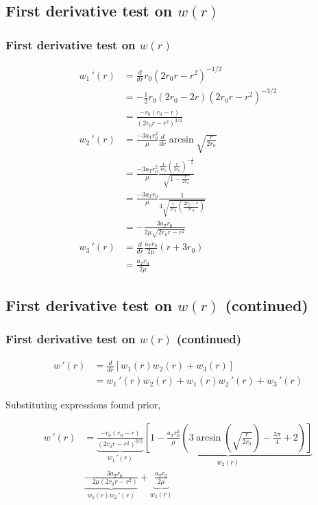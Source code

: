 \documentclass{beamer}
\newcommand{\sectit}[1]{
    \section{\texorpdfstring{#1}{}}
    \frametitle{#1}
}
\begin{document}
\begin{frame}
    \sectit{First derivative test on $w(r)$}

    {\tiny\begin{align}
        w_1\,'(r)&=\frac{d}{dr}r_0(2r_0r-r^2)^{-1/2}\\
        &=-\frac{1}{2}r_0(2r_0-2r)(2r_0r-r^2)^{-3/2}\\
        &=\frac{-r_0(r_0-r)}{(2r_0r-r^2)^{3/2}}\\
        w_2\,'(r)&=\frac{-3a_Tr_0^2}{\mu}\frac{d}{dr}\arcsin \sqrt{\frac{r}{2r_0}}\\
        &=\frac{-3a_Tr_0^2}{\mu}\frac{\frac{1}{4r_0}(\frac{r}{2r_0})^{-\frac{1}{2}}}{\sqrt{1-\frac{r}{2r_0}}}\\
        &=\frac{-3a_Tr_0}{\mu}\frac{1}{4\sqrt{\frac{r}{2r_0}(\frac{2r_0-r}{2r_0})}}\\
        &=-\frac{3a_Tr_0}{2\mu\sqrt{2r_0r-r^2}}\\
        w_3\,'(r)&=\frac{d}{dr}\frac{a_Tr_0}{2\mu}(r+3r_0)\\
        &=\frac{a_Tr_0}{2\mu}
    \end{align}}
\end{frame}

\begin{frame}
    \sectit{First derivative test on $w(r)$ (continued)}

    \begin{align}
        w\,'(r)&=\frac{d}{dr}\left[w_1(r)w_2(r)+w_3(r)\right]\\
        &=w_1\,'(r)w_2(r)+w_1(r)w_2\,'(r)+w_3\,'(r)
    \end{align}

    Substituting expressions found prior,

    {\scriptsize\begin{align}
        w\,'(r)&=\underbrace{\frac{-r_0(r_0-r)}{(2r_0r-r^2)^{3/2}}}_{w_1\,'(r)}\underbrace{\left[1-\frac{a_Tr_0^2}{\mu}\left(3\arcsin(\sqrt{\frac{r}{2r_0}})-\frac{3\pi}{4}+2\right)\right]}_{w_2(r)}\\
        &\underbrace{-\frac{3a_Tr_{0}}{2\mu\left(2 r_{0}r-r^2\right)}}_{w_1(r)w_2\,'(r)}+\underbrace{\frac{a_Tr_0}{2\mu}}_{w_3(r)}
    \end{align}}

\end{frame}
\end{document}

